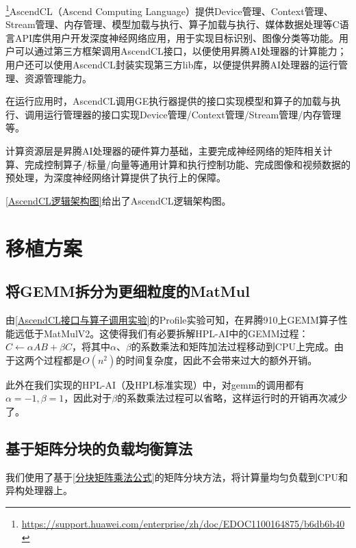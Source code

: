 \footnote{\url{https://support.huawei.com/enterprise/zh/doc/EDOC1100164875/b6db6b40}}AscendCL（Ascend Computing Language）提供Device管理、Context管理、Stream管理、内存管理、模型加载与执行、算子加载与执行、媒体数据处理等C语言API库供用户开发深度神经网络应用，用于实现目标识别、图像分类等功能。用户可以通过第三方框架调用AscendCL接口，以便使用昇腾AI处理器的计算能力；用户还可以使用AscendCL封装实现第三方lib库，以便提供昇腾AI处理器的运行管理、资源管理能力。

在运行应用时，AscendCL调用GE执行器提供的接口实现模型和算子的加载与执行、调用运行管理器的接口实现Device管理/Context管理/Stream管理/内存管理等。

计算资源层是昇腾AI处理器的硬件算力基础，主要完成神经网络的矩阵相关计算、完成控制算子/标量/向量等通用计算和执行控制功能、完成图像和视频数据的预处理，为深度神经网络计算提供了执行上的保障。

\autoref{AscendCL逻辑架构图}给出了AscendCL逻辑架构图。

\section{移植方案}

\subsection{将GEMM拆分为更细粒度的MatMul}

由\autoref{AscendCL接口与算子调用实验}的Profile实验可知，在昇腾910上GEMM算子性能远低于MatMulV2。这使得我们有必要拆解HPL-AI中的GEMM过程：$C\leftarrow\alpha AB+\beta C$，将其中$\alpha$、$\beta$的系数乘法和矩阵加法过程移动到CPU上完成。由于这两个过程都是$O(n^2)$的时间复杂度，因此不会带来过大的额外开销。

此外在我们实现的HPL-AI（及HPL标准实现）中，对gemm的调用都有$\alpha=-1,\beta=1$，因此对于$\beta$的系数乘法过程可以省略，这样运行时的开销再次减少了。

\subsection{基于矩阵分块的负载均衡算法}
\label{基于矩阵分块的负载均衡算法}

我们使用了基于\autoref{分块矩阵乘法公式}的矩阵分块方法，将计算量均匀负载到CPU和异构处理器上。

